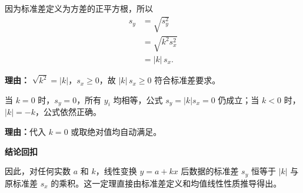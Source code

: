 \begin{proofbox}
\begin{description}[style=nextline, leftmargin=2.8em, labelsep=0.5em, itemsep=0.55em]
		\item[\textbf{步骤五（开方得标准差）：}]
			因为标准差定义为方差的正平方根，所以
			\[
				\begin{aligned}
					s_y &= \sqrt{s_y^2} \\
					&= \sqrt{k^2 s_x^2} \\
					&= |k|\, s_x .
			\end{aligned}
			\]
			\par\textbf{理由：} $\sqrt{k^2} = |k|$，$s_x \ge 0$，故 $|k|\, s_x \ge 0$ 符合标准差要求。

		\item[\textbf{步骤六（特殊情况验证）：}]
			当 $k=0$ 时，$s_y = 0$，所有 $y_i$ 均相等，公式 $s_y = |k| s_x = 0$ 仍成立；当 $k<0$ 时，$|k| = -k$，公式依然正确。
			\par\textbf{理由：}代入 $k=0$ 或取绝对值均自动满足。
	\end{description}

	\medskip
	\textbf{\textcolor{CProof}{结论回扣}}

	因此，对任何实数 $a$ 和 $k$，线性变换 $y = a + kx$ 后数据的标准差 $s_y$ 恒等于 $|k|$ 与原标准差 $s_x$ 的乘积。这一定理直接由标准差定义和均值线性性质推导得出。
\end{proofbox}
